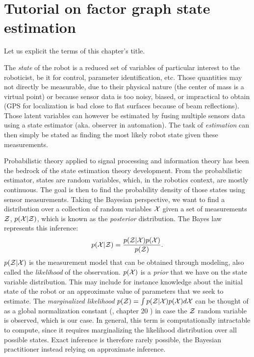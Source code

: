 \chapter{Tutorial on factor graph state estimation}
\minitoc

Let us explicit the terms of this chapter's title. 

The \textit{state} of the robot is a reduced set of variables of particular interest to the roboticist, be it for control, parameter identification, etc.
Those quantities may not directly be measurable, due to their physical nature (the center of mass is a virtual point) or because sensor data
is too noisy, biased, or impractical to obtain (\eg GPS for localization is bad close to flat surfaces because of beam reflections). 
Those latent variables can however be estimated by fusing multiple sensors data using a state estimator (aka. observer in automation). 
The task of \textit{estimation} can then simply be stated as finding the most likely robot state given these measurements. 

Probabilistic theory applied to signal processing and information theory has been the bedrock of the state estimation theory development.
From the probabilistic estimator, states are random variables, which, in the robotics context, are mostly continuous. 
The goal is then to find the probability density of those states using sensor measurements.
Taking the Bayesian perspective, we want to find a distribution over a collection of random variables $\mathcal{X}$ given a set 
of measurements $\mathcal{Z}$, $p(\mathcal{X} | \mathcal{Z})$, which is known as the \textit{posterior} distribution. 
The Bayes law represents this inference:
%
\begin{equation}
    p(\mathcal{X} | \mathcal{Z}) = \frac{p(\mathcal{Z} | \mathcal{X}) p(\mathcal{X})}{p(\mathcal{Z})}.
\end{equation}
%
$p(\mathcal{Z} | \mathcal{X})$ is the measurement model that can be obtained through modeling, also called the \textit{likelihood} of the observation. 
$p(\mathcal{X})$ is a \textit{prior} that we have on the state variable distribution. This may include for instance knowledge about the initial state of the robot or
an approximate value of parameters that we seek to estimate.
The \textit{marginalized likelihood} $p(\mathcal{Z}) = \int p(\mathcal{Z}|\mathcal{X})p(\mathcal{X})d\mathcal{X} $ can be thought of as a global normalization constant (\cite{koller2009probabilistic}, chapter 20 ) in case 
the $\mathcal{Z}$ random variable is observed, which is our case. In general, this term is computationally intractable to compute, since it requires marginalizing
the likelihood distribution over all possible states. Exact inference is therefore rarely possible, the Bayesian practitioner instead relying on approximate inference.

